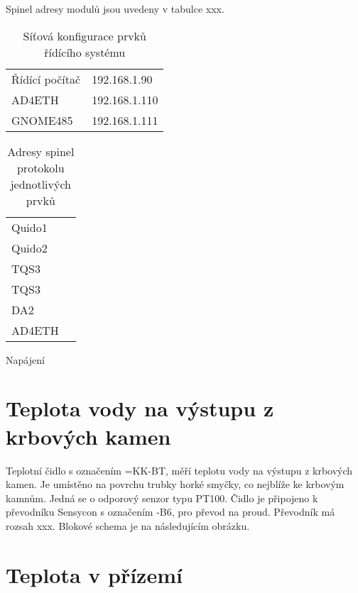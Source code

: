 \documentclass[a4paper,draft]{book}
\begin{document}
    Spinel adresy modulů jsou uvedeny v tabulce xxx.

    \begin{table}
      \centering
      \begin{tabular}{ll}
        Řídící počítač & 192.168.1.90 \\
        AD4ETH         & 192.168.1.110\\
        GNOME485       & 192.168.1.111\\
      \end{tabular}
      \caption{Síťová konfigurace prvků řídícího systému}
    \end{table}

    \begin{table}
      \centering
      \begin{tabular}{ll}
        Quido1 & \\
        Quido2 & \\
        TQS3   & \\
        TQS3   & \\
        DA2    & \\
        AD4ETH &
      \end{tabular}
      \caption{Adresy spinel protokolu jednotlivých prvků}
    \end{table}

    Napájení

    \section{Teplota vody na výstupu z krbových kamen}

        Teplotní čidlo s označením =KK-BT, měří teplotu vody na
        výstupu z krbových kamen. Je umístěno na povrchu
        trubky horké smyčky, co nejblíže ke krbovým kamnům. Jedná se o odporový
        senzor typu PT100. Čidlo je připojeno k převodníku
        Sensycon s označením -B6, pro převod na
        proud. Převodník má rozsah xxx. Blokové schema je na následujícím
        obrázku.

        \begin{tikzpicture}[scale=1.0]
        \end{tikzpicture}

    \section{Teplota v přízemí}
\end{document}

